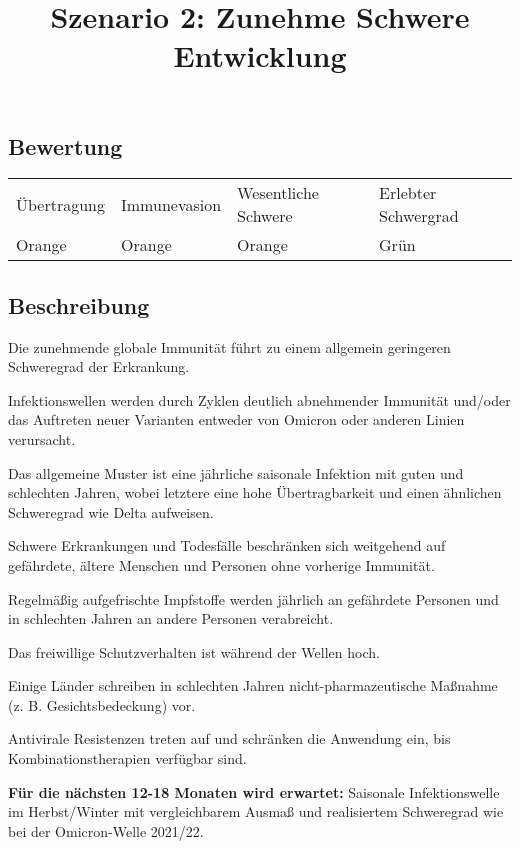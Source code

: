 \documentclass{article}
\begin{document}
\title{Szenario 2: Zunehme Schwere Entwicklung}

\maketitle





\subsection{Bewertung}\label{H9902957}



\begin{tabu} to \textwidth { |X|X|X|X| }
\hline



Übertragung   & Immunevasion & Wesentliche Schwere & Erlebter Schwergrad
 \\


Orange & Orange & Orange & Grün
 \\
\hline

\end{tabu}




\subsection{Beschreibung}\label{H3906327}



Die zunehmende globale Immunität führt zu einem allgemein geringeren Schweregrad der Erkrankung. 


Infektionswellen werden durch Zyklen deutlich abnehmender Immunität und/oder das Auftreten neuer Varianten entweder von Omicron oder anderen Linien verursacht. 


Das allgemeine Muster ist eine jährliche saisonale Infektion mit guten und schlechten Jahren, wobei letztere eine hohe Übertragbarkeit und einen ähnlichen Schweregrad wie Delta aufweisen. 


Schwere Erkrankungen und Todesfälle beschränken sich weitgehend auf gefährdete, ältere Menschen und Personen ohne vorherige Immunität. 


Regelmäßig aufgefrischte Impfstoffe werden jährlich an gefährdete Personen und in schlechten Jahren an andere Personen verabreicht. 


Das freiwillige Schutzverhalten ist während der Wellen hoch. 


Einige Länder schreiben in schlechten Jahren nicht-pharmazeutische Maßnahme (z. B. Gesichtsbedeckung) vor. 


Antivirale Resistenzen treten auf und schränken die Anwendung ein, bis Kombinationstherapien verfügbar sind.


\textbf{Für die nächsten 12-18 Monaten wird erwartet:} Saisonale Infektionswelle im Herbst/Winter mit vergleichbarem Ausmaß und realisiertem Schweregrad wie bei der Omicron-Welle 2021/22.
\end{document}

